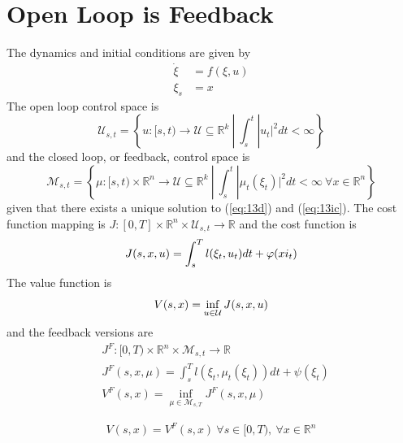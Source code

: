\mainmatter%
\setcounter{page}{1}

\lectureseries[\course]{\course}

\date{November 12, 2009}

\setaddress%

\setcounter{lecture}{12}
\setcounter{chapter}{12}


\section{Open Loop is Feedback}
The dynamics and initial conditions are given by
\begin{align}
\label{eq:13d}
\dot{\xi} &= f(\xi,u) \\
\label{eq:13ic}
\xi_s &= x
\end{align}
The open loop control space is
$$\mathcal{U}_{s,t} = \left\lbrace u:[s,t)\to\mathcal{U}\subseteq \mathbb{R}^k~|~\int_s^t |u_t|^2dt < \infty \right\rbrace$$%
and the closed loop, or feedback, control space is
$$\mathcal{M}_{s,t} = \left\lbrace \mu:[s,t)\times\mathbb{R}^n\to\mathcal{U}\subseteq\mathbb{R}^k~|~\int_s^t |\mu_t(\xi_t)|^2dt < \infty~\forall x \in \mathbb{R}^n \right\rbrace$$%
given that there exists a unique solution to (\ref{eq:13d}) and (\ref{eq:13ic}).
The cost function mapping is $J:[0,T]\times\mathbb{R}^n\times\mathcal{U}_{s,t}\to\mathbb{R}$ and the cost function is
\begin{align}
\label{eq:13cost}
J(s,x,u) = \int_s^T l(\xi_t,u_t)dt + \varphi(xi_t)
\end{align}
The value function is
$$V(s,x) = \inf_{u\in\mathcal{U}}J(s,x,u)$$
and the feedback versions are
\begin{align*}
&J^F: [0,T)\times\mathbb{R}^n\times\mathcal{M}_{s,t}\to\mathbb{R} \\%
&J^F(s,x,\mu) = \int_s^T l(\xi_t,\mu_t(\xi_t))dt + \psi(\xi_t) \\
&V^F(s,x) = \inf_{\mu\in\mathcal{M}_{s,T}}J^F(s,x,\mu)
\end{align*}

\begin{proposition}
\label{prop:13value}
$$V(s,x) = V^F(s,x)~\forall s\in[0,T),~\forall x\in\mathbb{R}^n$$%
\end{proposition}


